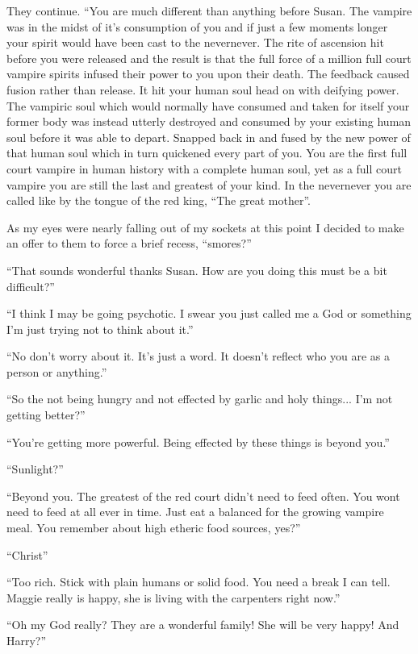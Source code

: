 They continue. ``You are much different than anything before Susan. The vampire was in the midst of it's consumption of you and if just a few moments longer your spirit would have been cast to the nevernever. The rite of ascension hit before you were released and the result is that the full force of a million full court vampire spirits infused their power to you upon their death. The feedback caused fusion rather than release. It hit your human soul head on with deifying power. The vampiric soul which would normally have consumed and taken for itself your former body was instead utterly destroyed and consumed by your existing human soul before it was able to depart. Snapped back in and fused by the new power of that human soul which in turn quickened every part of you. You are the first full court vampire in human history with a complete human soul, yet as a full court vampire you are still the last and greatest of your kind. In the nevernever you are called like by the tongue of the red king, ``The great mother''. 

As my eyes were nearly falling out of my sockets at this point I decided to make an offer to them to force a brief recess,  ``smores?''

``That sounds wonderful thanks Susan. How are you doing this must be a bit difficult?''

``I think I may be going psychotic. I swear you just called me a God or something I'm just trying not to think about it.''

``No don't worry about it. It's just a word. It doesn't reflect who you are as a person or anything.''

``So the not being hungry and not effected by garlic and holy things... I'm not getting better?''

``You're getting more powerful. Being effected by these things is beyond you.''

``Sunlight?''

``Beyond you. The greatest of the red court didn't need to feed often. You wont need to feed at all ever in time. Just eat a balanced for the growing vampire meal. You remember about high etheric food sources, yes?''

``Christ''

``Too rich. Stick with plain humans or solid food. You need a break I can tell. Maggie really is happy, she is living with the carpenters right now.''

``Oh my God really? They are a wonderful family! She will be very happy! And Harry?''

